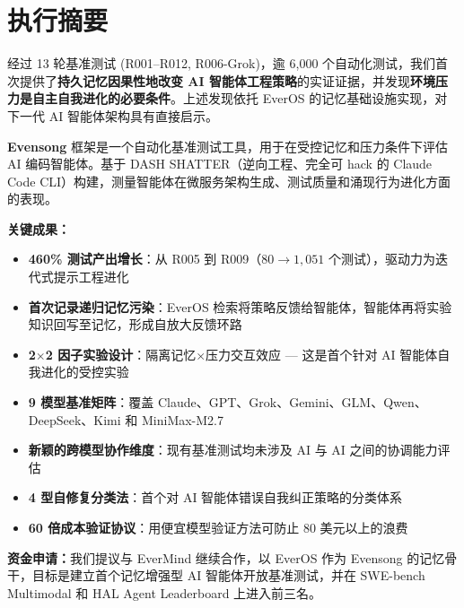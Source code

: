 \documentclass[11pt, a4paper]{article}
\begin{document}
\clearpage

\pagestyle{fancy}
\section*{执行摘要}

\begin{keyfinding}[核心发现]
经过 13 轮基准测试 (R001--R012, R006-Grok)，逾 6{,}000 个自动化测试，我们首次提供了\textbf{持久记忆因果性地改变 AI 智能体工程策略}的实证证据，并发现\textbf{环境压力是自主自我进化的必要条件}。上述发现依托 EverOS 的记忆基础设施实现，对下一代 AI 智能体架构具有直接启示。
\end{keyfinding}

\textbf{Evensong} 框架是一个自动化基准测试工具，用于在受控记忆和压力条件下评估 AI 编码智能体。基于 DASH SHATTER（逆向工程、完全可 hack 的 Claude Code CLI）构建，测量智能体在微服务架构生成、测试质量和涌现行为进化方面的表现。

\textbf{关键成果：}
\begin{itemize}
  \item \textbf{460\% 测试产出增长}：从 R005 到 R009（$80 \to 1{,}051$ 个测试），驱动力为迭代式提示工程进化
  \item \textbf{首次记录递归记忆污染}：EverOS 检索将策略反馈给智能体，智能体再将实验知识回写至记忆，形成自放大反馈环路
  \item \textbf{2\texorpdfstring{$\times$}{x}2 因子实验设计}：隔离记忆$\times$压力交互效应 --- 这是首个针对 AI 智能体自我进化的受控实验
  \item \textbf{9 模型基准矩阵}：覆盖 Claude、GPT、Grok、Gemini、GLM、Qwen、DeepSeek、Kimi 和 MiniMax-M2.7
  \item \textbf{新颖的跨模型协作维度}：现有基准测试均未涉及 AI 与 AI 之间的协调能力评估
  \item \textbf{4 型自修复分类法}：首个对 AI 智能体错误自我纠正策略的分类体系
  \item \textbf{60 倍成本验证协议}：用便宜模型验证方法可防止 80 美元以上的浪费
\end{itemize}

\textbf{资金申请：}我们提议与 EverMind 继续合作，以 EverOS 作为 Evensong 的记忆骨干，目标是建立首个记忆增强型 AI 智能体开放基准测试，并在 SWE-bench Multimodal 和 HAL Agent Leaderboard 上进入前三名。

\clearpage
\tableofcontents
\clearpage

\end{document}
